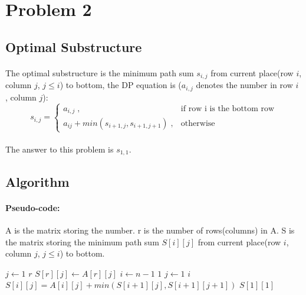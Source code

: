 \documentclass[]{article}
\begin{document}
    \section{Problem 2}
        \subsection{Optimal Substructure}
            \paragraph{}The optimal substructure is the minimum path sum $s_{i,j}$ from current place(row $i$, column $j$, $j \leq i$) to bottom, the DP equation is ($a_{i,j}$ denotes the number in row $i$ , column $j$):
            \begin{equation*}
            s_{i,j} = \begin{cases}
                     a_{i,j} \;,   & \text{if row i is the bottom row}   \\
                     a_{ij}+min(s_{i+1,j},s_{i+1,j+1}) \;, & \text{otherwise}
                     \end{cases}
            \end{equation*}
            \paragraph{} The answer to this problem is $s_{1,1}$.
        \subsection{Algorithm}
        \paragraph{Pseudo-code:} A is the matrix storing the number. r is the number of rows(columns) in A. S is the matrix storing the minimum path sum $S[i][j]$ from current place(row $i$, column $j$, $j \leq i$) to bottom.
\begin{codebox}
\li \For $j \gets 1$ \To $r$
\li     \Do
            $S[r][j] \gets A[r][j]$ 
        \End 
\li \For $i \gets n-1$ \To $1$
\li     \Do
            \For $j \gets 1$ \To $i$
\li             \Do
                    $S[i][j] = A[i][j] + min(S[i+1][j],S[i+1][j+1])$
            \End
        \End
\li \Return $S[1][1]$
\end{codebox}
\end{document}
